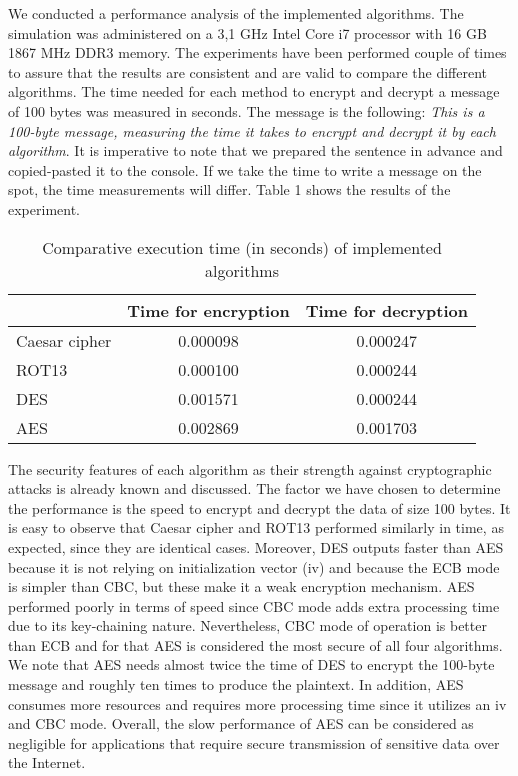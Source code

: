 We conducted a performance analysis of the implemented algorithms. The simulation was administered on a 3,1 GHz Intel Core i7 processor with 16 GB 1867 MHz DDR3 memory. The experiments have been performed couple of times to assure that the results are consistent and are valid to compare the different algorithms. The time needed for each method to encrypt and decrypt a message of 100 bytes was measured in seconds. The message is the following: \textit{This is a 100-byte message, measuring the time it takes to encrypt and decrypt it by each algorithm}. It is imperative to note that we prepared the sentence in advance and copied-pasted it to the console. If we take the time to write a message on the spot, the time measurements will differ. Table 1 shows the results of the experiment. 

\begin{table}[]
\begin{tabular}{|l|c|c|}
\hline
\multicolumn{1}{|c|}{} & Time for encryption & \multicolumn{1}{l|}{Time for decryption} \\ \hline
Caesar cipher & 0.000098 & 0.000247 \\ \hline
ROT13 & 0.000100 & 0.000244 \\ \hline
DES & 0.001571 & 0.000244 \\ \hline
AES & 0.002869 & 0.001703 \\ \hline
\end{tabular}
\caption{Comparative execution time (in seconds) of implemented algorithms}
\label{my-label}
\end{table}

The security features of each algorithm as their strength against cryptographic attacks is already known and discussed. The factor we have chosen to determine the performance is the speed to encrypt and decrypt the data of size 100 bytes. It is easy to observe that Caesar cipher and ROT13 performed similarly in time, as expected, since they are identical cases. Moreover, DES outputs faster than AES because it is not relying on initialization vector (iv) and because the ECB mode is simpler than CBC, but these make it a weak encryption mechanism. AES performed poorly in terms of speed since CBC mode adds extra processing time due to its key-chaining nature. Nevertheless, CBC mode of operation is better than ECB and for that AES is considered the most secure of all four algorithms. We note that AES needs almost twice the time of DES to encrypt the 100-byte message and roughly ten times to produce the plaintext. In addition, AES consumes more resources and requires more processing time since it utilizes an iv and CBC mode. Overall, the slow performance of AES can be considered as negligible for applications that require secure transmission of sensitive data over the Internet.

